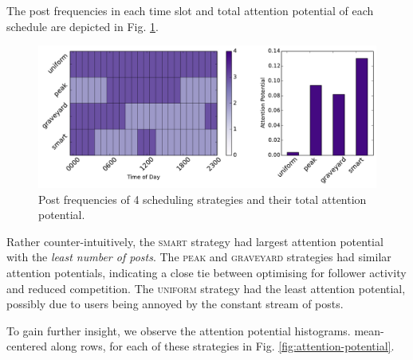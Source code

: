 \documentclass[onesided,letterpaper]{tufte-book}
\begin{document}
The post frequencies in each time slot and total attention potential of each schedule are depicted in Fig. \ref{fig:performance}.

\begin{figure}
    \includegraphics[width=\linewidth]{schedule_performance}
    \caption[Post frequencies and attention potential of the selected scheduling strategies.]{Post frequencies of 4 scheduling strategies and their total attention potential.}
    \label{fig:performance}
\end{figure}

Rather counter-intuitively, the \textsc{smart} strategy had largest attention potential with the \textit{least number of posts}. The \textsc{peak} and \textsc{graveyard} strategies had similar attention potentials, indicating a close tie between optimising for follower activity and reduced competition. The \textsc{uniform} strategy had the least attention potential, possibly due to users being annoyed by the constant stream of posts.

To gain further insight, we observe the attention potential histograms. mean-centered along rows, for each of these strategies in Fig. \ref{fig:attention-potential}.
\end{document}
